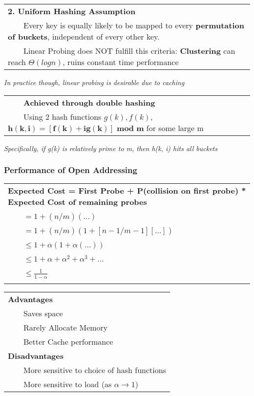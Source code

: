 \documentclass{article}
\newcommand{\tabitem}{~~\llap{\textbullet}~~}
\begin{document}
    \noindent\begin{tabular}{l}
        \textbf{2. Uniform Hashing Assumption}\\
        \tabitem Every key is equally likely to be mapped to every \textbf{permutation of buckets}, independent of every other key.\\
        \tabitem Linear Probing does NOT fulfill this criteria: \textbf{Clustering} can reach $\Theta(logn)$, ruins constant time performance\\
    \end{tabular}

    \emph{In practice though, linear probing is desirable due to caching}

    \noindent\begin{tabular}{l}
        \tabitem\textbf{Achieved through double hashing}\\
        \tabitem Using 2 hash functions $g(k), f(k)$, $\bm{h(k, i) = [f(k) + ig(k)]}$ $\bm{mod}$ \textbf{m} for some large m\\
    \end{tabular}

    \emph{Specifically, if g(k) is relatively prime to m, then h(k, i) hits all buckets}

    \pagebreak

    \subsubsection{Performance of Open Addressing}
    \noindent\begin{tabular}{l}
        \textbf{Expected Cost = First Probe + P(collision on first probe) * Expected Cost of remaining probes}\\
        \tabitem $= 1 + (n/m)(...)$\\
        \tabitem $= 1 + (n/m)(1 + [n-1/m-1][...])$\\
        \tabitem $\leq 1 + \alpha(1 + \alpha(...))$\\
        \tabitem $\leq 1 + \alpha + \alpha^{2} + \alpha^{3} + ...$\\
        \tabitem $\leq \frac{1}{1 - \alpha}$\\\\
    \end{tabular}

    \noindent\begin{tabular}{l}
        \textbf{Advantages}\\
        \tabitem Saves space\\
        \tabitem Rarely Allocate Memory\\
        \tabitem Better Cache performance\\
        \textbf{Disadvantages}\\
        \tabitem More sensitive to choice of hash functions\\
        \tabitem More sensitive to load (as $\alpha \rightarrow 1$)
    \end{tabular}
\end{document}
